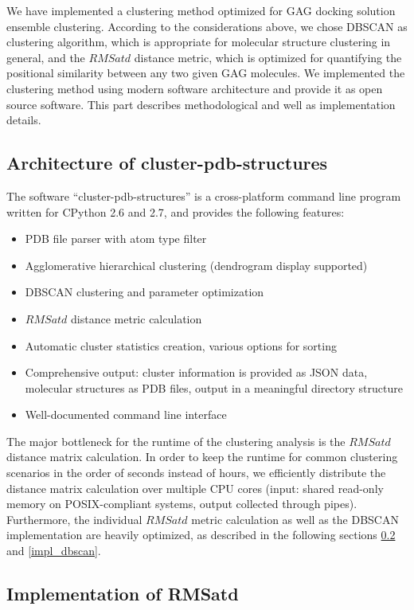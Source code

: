 We have implemented a clustering method optimized for GAG docking solution
ensemble clustering. According to the considerations above, we chose DBSCAN as
clustering algorithm, which is appropriate for molecular structure clustering in
general, and the $RMSatd$ distance metric, which is optimized for quantifying
the positional similarity between any two given GAG molecules. We implemented
the clustering method using modern software architecture and provide it as open
source software. This part describes methodological and well as implementation
details.

\subsection{Architecture of cluster-pdb-structures}

The software \enquote{cluster-pdb-structures} is a cross-platform command line
program written for CPython 2.6 and 2.7, and provides the following features:

\begin{itemize}
\item PDB file parser with atom type filter
\item Agglomerative hierarchical clustering (dendrogram display supported)
\item DBSCAN clustering and parameter optimization
\item $RMSatd$ distance metric calculation
\item Automatic cluster statistics creation, various options for sorting
\item Comprehensive output: cluster information is provided as JSON data,
molecular structures as PDB files, output in a meaningful directory structure
\item Well-documented command line interface
\end{itemize}

The major bottleneck for the runtime of the clustering analysis is the $RMSatd$
distance matrix calculation. In order to keep the runtime for common clustering
scenarios in the order of seconds instead of hours, we efficiently distribute
the distance matrix calculation over multiple CPU cores (input: shared read-only
memory on POSIX-compliant systems, output collected through pipes). Furthermore,
the individual $RMSatd$ metric calculation as well as the DBSCAN implementation
are heavily optimized, as described in the following sections
\ref{impl_rmsatd} and \ref{impl_dbscan}.


\subsection{Implementation of RMSatd}
\label{impl_rmsatd}

